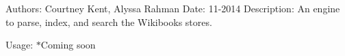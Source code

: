 Authors\+: Courtney Kent, Alyssa Rahman Date\+: 11-\/2014 Description\+: An engine to parse, index, and search the Wikibooks stores.

Usage\+: $\ast$\+Coming soon 